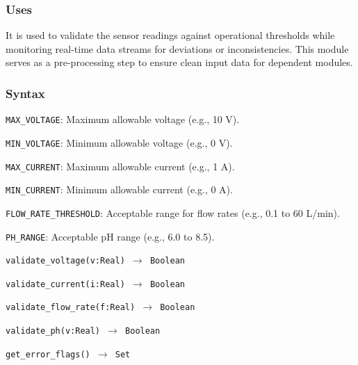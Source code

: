 \documentclass[12pt, titlepage]{article}
\begin{document}
\subsubsection{Uses}
It is used to validate the sensor readings against operational thresholds while monitoring real-time 
data streams for deviations or inconsistencies. This module serves as a pre-processing step to ensure 
clean input data  for dependent modules.

\subsubsection{Syntax}
\begin{description}
  \item[Exported Constants:]
  \item 
  \texttt{MAX\_VOLTAGE}: Maximum allowable voltage (e.g., 10 V).
  \item
  \texttt{MIN\_VOLTAGE}: Minimum allowable voltage (e.g., 0 V).
  \item
  \texttt{MAX\_CURRENT}: Maximum allowable current (e.g., 1 A).
  \item
  \texttt{MIN\_CURRENT}: Minimum allowable current (e.g., 0 A).
  \item
  \texttt{FLOW\_RATE\_THRESHOLD}: Acceptable range for flow rates (e.g., 0.1 to 60 L/min).
  \item
  \texttt{PH\_RANGE}: Acceptable pH range (e.g., 6.0 to 8.5).
  \item
  \item[Exported Access Programs:]
  \item
  \texttt{validate\_voltage(v:Real) \(\to\) Boolean}
  \item 
  \texttt{validate\_current(i:Real) \(\to\) Boolean}
  \item 
  \texttt{validate\_flow\_rate(f:Real) \(\to\) Boolean}
  \item
  \texttt{validate\_ph(v:Real) \(\to\) Boolean}
  \item
  \texttt{get\_error\_flags() \(\to\) Set}
\end{description}
\end{document}
